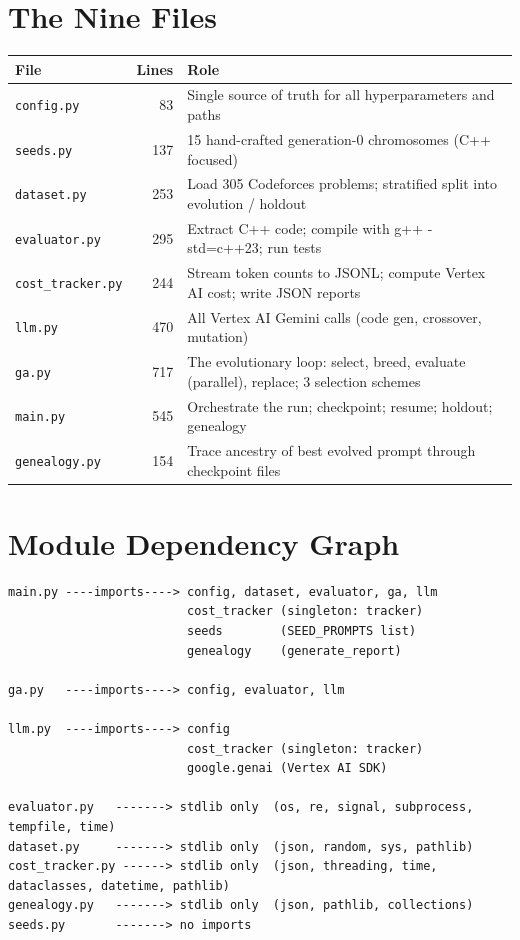 \documentclass[11pt,a4paper]{report}
\newcommand{\pyf}[1]{\texttt{#1}}
\begin{document}
\section{The Nine Files}

\begin{center}
\begin{tabular}{@{}lrp{7cm}@{}}
\toprule
\textbf{File} & \textbf{Lines} & \textbf{Role} \\
\midrule
\pyf{config.py}        & 83  & Single source of truth for all hyperparameters and paths \\
\pyf{seeds.py}         & 137 & 15 hand-crafted generation-0 chromosomes (C++ focused) \\
\pyf{dataset.py}       & 253 & Load 305 Codeforces problems; stratified split into evolution / holdout \\
\pyf{evaluator.py}     & 295 & Extract C++ code; compile with g++ -std=c++23; run tests \\
\pyf{cost\_tracker.py} & 244 & Stream token counts to JSONL; compute Vertex AI cost; write JSON reports \\
\pyf{llm.py}           & 470 & All Vertex AI Gemini calls (code gen, crossover, mutation) \\
\pyf{ga.py}            & 717 & The evolutionary loop: select, breed, evaluate (parallel), replace; 3 selection schemes \\
\pyf{main.py}          & 545 & Orchestrate the run; checkpoint; resume; holdout; genealogy \\
\pyf{genealogy.py}     & 154 & Trace ancestry of best evolved prompt through checkpoint files \\
\bottomrule
\end{tabular}
\end{center}

\section{Module Dependency Graph}

\begin{lstlisting}[style=chain]
main.py ----imports----> config, dataset, evaluator, ga, llm
                         cost_tracker (singleton: tracker)
                         seeds        (SEED_PROMPTS list)
                         genealogy    (generate_report)

ga.py   ----imports----> config, evaluator, llm

llm.py  ----imports----> config
                         cost_tracker (singleton: tracker)
                         google.genai (Vertex AI SDK)

evaluator.py   -------> stdlib only  (os, re, signal, subprocess, tempfile, time)
dataset.py     -------> stdlib only  (json, random, sys, pathlib)
cost_tracker.py ------> stdlib only  (json, threading, time, dataclasses, datetime, pathlib)
genealogy.py   -------> stdlib only  (json, pathlib, collections)
seeds.py       -------> no imports
\end{lstlisting}
\end{document}
